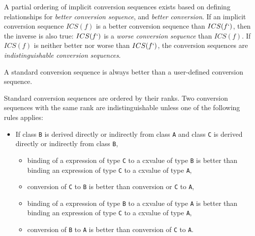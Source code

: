 

\p A partial ordering of implicit conversion sequences exists based on defining
relationships for \textit{better conversion sequence}, and \textit{better
conversion}. If an implicit conversion sequence \(ICS(f)\) is a better
conversion sequence than \(ICS(f`)\), then the inverse is also true: \(ICS(f`)\)
is a \textit{worse conversion sequence} than \(ICS(f)\). If \(ICS(f)\) is
neither better nor worse than \(ICS(f`)\), the conversion sequences are
\textit{indistinguishable conversion sequences}.

\p A standard conversion sequence is always better than a user-defined
conversion sequence.

\p Standard conversion sequences are ordered by their ranks. Two conversion
sequences with the same rank are indistinguishable unless one of the following
rules applies:

\begin{itemize}
  \item If class \texttt{B} is derived directly or indirectly from class
  \texttt{A} and class \texttt{C} is derived directly or indirectly from class
  \texttt{B},
  \begin{itemize}
    \item binding of a expression of type \texttt{C} to a cxvalue of type
    \texttt{B} is better than binding an expression of type \texttt{C} to a
    cxvalue of type \texttt{A},
    \item conversion of \texttt{C} to \texttt{B} is better than conversion or
    \texttt{C} to \texttt{A},
    \item binding of a expression of type \texttt{B} to a cxvalue of type
    \texttt{A} is better than binding an expression of type \texttt{C} to a
    cxvalue of type \texttt{A},
    \item conversion of \texttt{B} to \texttt{A} is better than conversion of
    \texttt{C} to \texttt{A}.
  \end{itemize}
\end{itemize}
